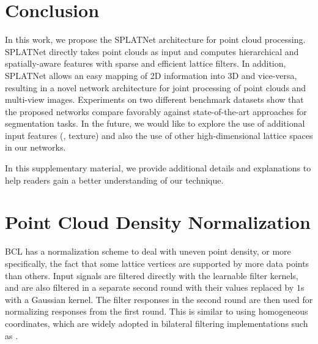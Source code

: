 \documentclass[10pt,twocolumn,letterpaper]{article}
\newcommand{\camreadycomment}[1]{{\textcolor{red}{#1}}}
\begin{document}
\section{Conclusion}\label{sec:conclusion}

In this work, we propose the SPLATNet architecture for point cloud processing. SPLATNet directly takes point clouds as input and computes hierarchical and spatially-aware features with sparse and efficient lattice filters. In addition, SPLATNet allows an easy mapping of 2D information into 3D and vice-versa, resulting in a novel network architecture for joint processing of point clouds and multi-view images. Experiments on two different benchmark datasets show that the proposed networks compare favorably against state-of-the-art approaches for segmentation tasks. In the future, we would like to explore the use of additional input features (\eg, texture) and also the use of other high-dimensional lattice spaces in our networks.




{\small


}

\newpage
\clearpage
{}
\vspace{0.3cm}


\renewcommand\thesection{\Alph{section}}

In this supplementary material, we provide additional details and explanations to help readers gain 
a better understanding of our technique. 



\section{Point Cloud Density Normalization}%
BCL has a normalization scheme to deal with uneven point density, or more specifically, the fact that some lattice vertices are supported by more data points than others.
Input signals are filtered directly with the learnable filter kernels, and are also filtered in a separate second round with their values replaced by $1$s with a Gaussian kernel. The filter responses in the second round are then used for normalizing responses from the first round.
This is similar
to using homogeneous coordinates, which are widely adopted in bilateral filtering implementations such as \cite{adams2010fast}.
\end{document}
